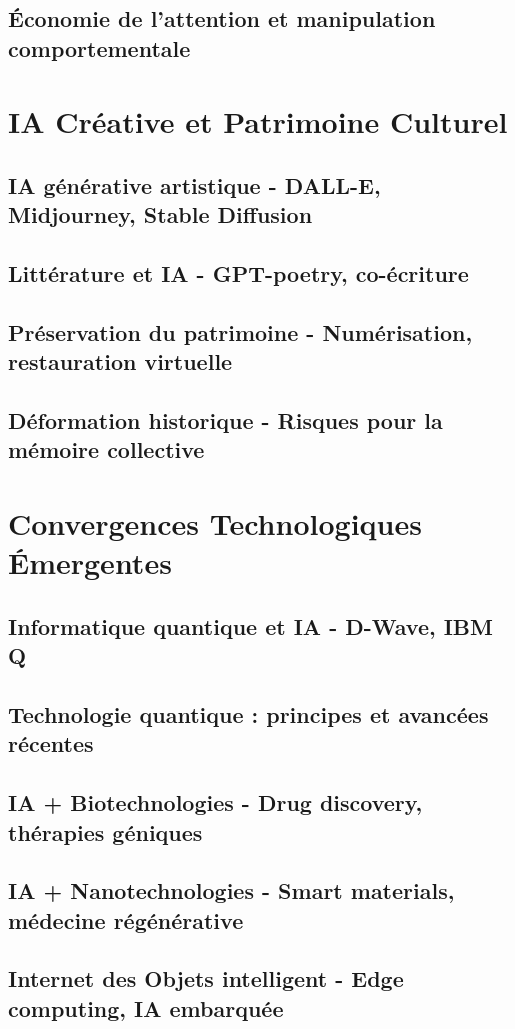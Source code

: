 \documentclass[12pt,a4paper]{book}
\begin{document}
\section{Économie de l'attention et manipulation comportementale}

\chapter{IA Créative et Patrimoine Culturel}
\section{IA générative artistique - DALL-E, Midjourney, Stable Diffusion}
\section{Littérature et IA - GPT-poetry, co-écriture}
\section{Préservation du patrimoine - Numérisation, restauration virtuelle}
\section{Déformation historique - Risques pour la mémoire collective}

\chapter{Convergences Technologiques Émergentes}
\section{Informatique quantique et IA - D-Wave, IBM Q}
\section{Technologie quantique : principes et avancées récentes}
\section{IA + Biotechnologies - Drug discovery, thérapies géniques}
\section{IA + Nanotechnologies - Smart materials, médecine régénérative}
\section{Internet des Objets intelligent - Edge computing, IA embarquée}
\end{document}
